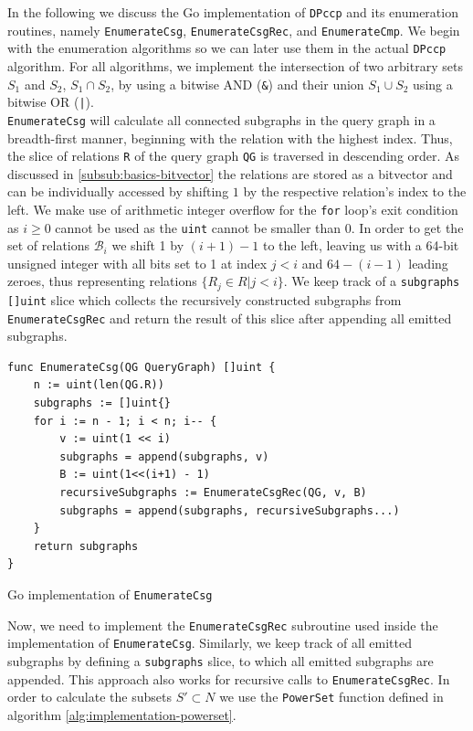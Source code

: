 In the following we discuss the Go implementation of \texttt{DPccp} and its enumeration routines, namely \texttt{EnumerateCsg}, \texttt{EnumerateCsgRec}, and \texttt{EnumerateCmp}. We begin with the enumeration algorithms so we can later use them in the actual \texttt{DPccp} algorithm.
For all algorithms, we implement the intersection of two arbitrary sets $S_1$ and $S_2$, $S_1 \cap S_2$, by using a bitwise AND (\texttt{\&}) and their union $S_1 \cup S_2$ using a bitwise OR (\texttt{|}).\\

\texttt{EnumerateCsg} will calculate all connected subgraphs in the query graph in a breadth-first manner, beginning with the relation with the highest index. Thus, the slice of relations \texttt{R} of the query graph \texttt{QG} is traversed in descending order. As discussed in \ref{subsub:basics-bitvector} the relations are stored as a bitvector and can be individually accessed by shifting $1$ by the respective relation's index to the left. We make use of arithmetic integer overflow for the \texttt{for} loop's exit condition as $i \geq 0$ cannot be used as the \texttt{uint} cannot be smaller than 0. In order to get the set of relations $\mathcal{B}_i$ we shift 1 by $(i+1) - 1$ to the left, leaving us with a 64-bit unsigned integer with all bits set to 1 at index $j < i$ and $64 - (i-1)$ leading zeroes, thus representing relations $\{R_{j} \in R \vert j < i\}$. We keep track of a \texttt{subgraphs} \texttt{[]uint} slice which collects the recursively constructed subgraphs from \texttt{EnumerateCsgRec} and return the result of this slice after appending all emitted subgraphs.
\vspace{0.4cm}

\begin{algorithm}[H]
\begin{verbatim}
func EnumerateCsg(QG QueryGraph) []uint {
    n := uint(len(QG.R))
    subgraphs := []uint{}
    for i := n - 1; i < n; i-- {
        v := uint(1 << i)
        subgraphs = append(subgraphs, v)
        B := uint(1<<(i+1) - 1)
        recursiveSubgraphs := EnumerateCsgRec(QG, v, B)
        subgraphs = append(subgraphs, recursiveSubgraphs...)
    }
    return subgraphs
}
\end{verbatim}
\caption{Go implementation of \texttt{EnumerateCsg}}
\label{alg:enumeratecsg}
\end{algorithm}
\vspace{0.8cm}

Now, we need to implement the \texttt{EnumerateCsgRec} subroutine used inside the implementation of \texttt{EnumerateCsg}. Similarly, we keep track of all emitted subgraphs by defining a \texttt{subgraphs} slice, to which all emitted subgraphs are appended. This approach also works for recursive calls to \texttt{EnumerateCsgRec}. In order to calculate the subsets $S' \subset N$ we use the \texttt{PowerSet} function defined in algorithm \ref{alg:implementation-powerset}.

